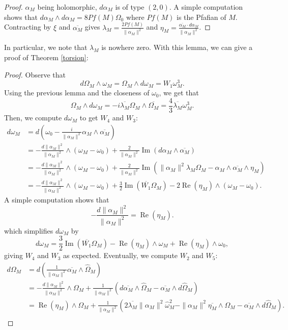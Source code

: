 \documentclass[12pt, reqno]{amsart}
\DeclareMathOperator\Ima{Im}
\DeclareMathOperator\Ree{Re}
\begin{document}
\begin{proof}
    $\alpha_M$ being holomorphic, $d\alpha_M$ is of type $(2,0)$. A simple computation shows that $d\alpha_M\wedge d\alpha_M=8Pf(M)\Omega_0$ where $Pf(M)$ is the Pfafian of $M$. Contracting by $\xi$ and $\overline{\alpha_M}$ gives $\lambda_M=\frac{2Pf(M)}{\|\alpha_M\|^2}$ and $\eta_M=\frac{\overline{\alpha_M}\cdot d\alpha_M}{\|\alpha_M\|^2}$.
\end{proof}
In particular, we note that $\lambda_M$ is nowhere zero. With this lemma, we can give a proof of Theorem \ref{torsion}:
\begin{proof}
    Observe that \[d\Omega_M\wedge\omega_M=\Omega_M\wedge d\omega_M=W_1\omega_M^3.\] Using the previous lemma and the closeness of $\omega_0$, we get that \[\Omega_M\wedge d\omega_M=-i\overline{\lambda_M}\Omega_M\wedge\overline{\Omega_M}=\frac{4}{3}\overline{\lambda_M}\omega_M^3.\] Then, we compute $d\omega_M$ to get $W_4$ and $W_3$: \begin{align*}
        d\omega_M&=d(\omega_0-\frac{i}{\|\alpha_M\|^2}\alpha_M\wedge\overline{\alpha_M})\\
        &=-\frac{d\|\alpha_M\|^2}{\|\alpha_M\|^2}\wedge(\omega_M-\omega_0)+\frac{2}{\|\alpha_M\|^2}\Ima(d\alpha_M\wedge\overline{\alpha_M})\\
        &=-\frac{d\|\alpha_M\|^2}{\|\alpha_M\|^2}\wedge(\omega_M-\omega_0)+\frac{2}{\|\alpha_M\|^2}\Ima(\|\alpha_M\|^2\lambda_M\Omega_M-\alpha_M\wedge\overline{\alpha_M}\wedge\eta_M)\\
        &=-\frac{d\|\alpha_M\|^2}{\|\alpha_M\|^2}\wedge(\omega_M-\omega_0)+\frac{3}{2}\Ima(\overline{W_1}\Omega_M)-2\Ree(\eta_M)\wedge(\omega_M-\omega_0).
    \end{align*}
    A simple computation shows that \[-\frac{d\|\alpha_M\|^2}{\|\alpha_M\|^2}=\Ree(\eta_M).\] which simplifies $d\omega_M$ by \[d\omega_M=\frac{3}{2}\Ima(\overline{W_1}\Omega_M)-\Ree(\eta_M)\wedge\omega_M+\Ree(\eta_M)\wedge\omega_0,\] giving $W_4$ and $W_3$ as expected. Eventually, we compute $W_2$ and $W_5$: \begin{align*}
        d\Omega_M&=d(\frac{1}{\|\alpha_M\|^2}\overline{\alpha_M}\wedge\hat\Omega_M)\\
        &=-\frac{d\|\alpha_M\|^2}{\|\alpha_M\|^2}\wedge\Omega_M+\frac{1}{\|\alpha_M\|^2}(d\overline{\alpha_M}\wedge\hat\Omega_M-\overline{\alpha_M}\wedge d\hat\Omega_M)\\
        &=\Ree(\eta_M)\wedge\Omega_M+\frac{1}{\|\alpha_M\|^2}(2\overline{\lambda_M}\|\alpha_M\|^2\hat\omega_M^2-\|\alpha_M\|^2\overline{\eta_M}\wedge\Omega_M-\overline{\alpha_M}\wedge d\hat\Omega_M).\\

\end{align*}
\end{proof}
\end{document}
